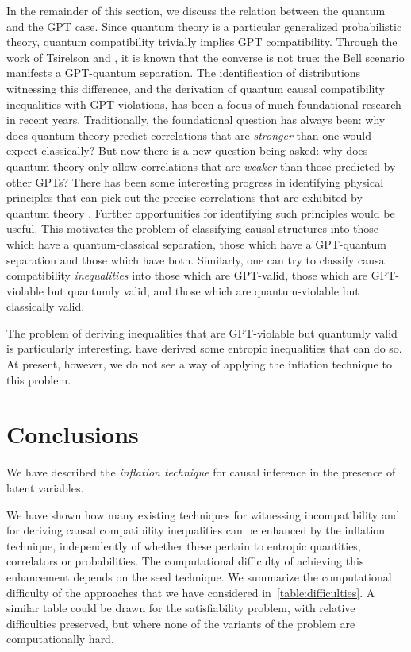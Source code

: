 \documentclass[aps,english,10pt,superscriptaddress,onecolumn,twoside,longbibliography,pra,floatfix,fleqn,nofootinbib]{revtex4-1}
\theoremstyle{definition}
\begin{document}
In the remainder of this section, we discuss the relation between the quantum and the GPT case. Since quantum theory is a particular generalized probabilistic theory, quantum compatibility trivially implies GPT compatibility. Through the work of Tsirelson \cite{Tsirelson1980} and \citet{PROriginal}, it is known that the converse is not true: the Bell scenario manifests a GPT-quantum separation.  The identification of distributions witnessing this difference, and the derivation of quantum causal compatibility inequalities with GPT violations, has been a focus of much foundational research in recent years. Traditionally, the foundational question has always been: why does quantum theory predict correlations that are {\em stronger} than one would expect classically?  But now there is a new question being asked: why does quantum theory only allow correlations that are {\em weaker} than those predicted by other GPTs?  There has been some interesting progress in identifying physical principles that can pick out the precise correlations that are exhibited by quantum theory \cite{PopescuReviewNatureComm,ScaraniML,Rohrlich2014,InfoCausArXiv,LONatureComm,LOExploring,EPNBody,barnum2014interference,AlmostQuantum}.  Further opportunities for identifying such principles would be useful.  This motivates the problem of classifying causal structures into those which have a quantum-classical separation, those which have a GPT-quantum separation and those which have both. Similarly, one can try to classify causal compatibility \emph{inequalities} into those which are GPT-valid, those which are GPT-violable but quantumly valid, and those which are quantum-violable but classically valid. 

The problem of deriving inequalities that are GPT-violable but quantumly valid is particularly interesting.  
\citet{Chaves2015infoquantum} have derived some entropic inequalities that can do so.  At present, however, we do not see a way of applying the inflation technique to this problem. 

\section{Conclusions}

We have described the \emph{inflation technique} for causal inference in the presence of latent variables.

We have shown how many existing techniques for witnessing incompatibility and for deriving causal compatibility inequalities can be enhanced by the inflation technique, independently of whether these pertain to entropic quantities, correlators or probabilities. The computational difficulty of achieving this enhancement depends on the seed technique.  We summarize the computational difficulty of the approaches that we have considered in~\cref{table:difficulties}. A similar table could be drawn for the satisfiability problem, with relative difficulties preserved, but where none of the variants of the problem are computationally hard.
\end{document}
